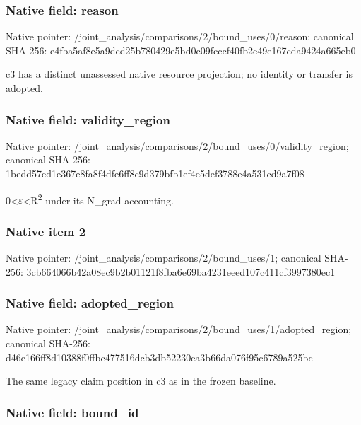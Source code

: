 \documentclass[10pt,a4paper]{article}
\begin{document}
\subsubsection{Native field: reason}


Native pointer: /joint\_analysis/comparis\allowbreak{}ons/2/bound\_uses/0/reaso\allowbreak{}n; canonical SHA-256: e4fba5af8e5a9dcd25b78042\allowbreak{}9e5bd0c09fcccf40fb2e49e1\allowbreak{}67cda9424a665eb0


c3 has a distinct unassessed native resource projection; no identity or transfer is adopted.


\subsubsection{Native field: validity\_region}


Native pointer: /joint\_analysis/comparis\allowbreak{}ons/2/bound\_uses/0/valid\allowbreak{}ity\_region; canonical SHA-256: 1bedd57ed1e367e8fa8f4dfe\allowbreak{}6ff8c9d379bfb1ef4e5def37\allowbreak{}88e4a531cd9a7f08


0<\ensuremath{\varepsilon}<R\textsuperscript{2} under its N\_grad accounting.


\subsubsection{Native item 2}


Native pointer: /joint\_analysis/comparis\allowbreak{}ons/2/bound\_uses/1; canonical SHA-256: 3cb664066b42a08ec9b2b011\allowbreak{}21f8fba6e69ba4231eeed107\allowbreak{}c411cf3997380ec1



\subsubsection{Native field: adopted\_region}


Native pointer: /joint\_analysis/comparis\allowbreak{}ons/2/bound\_uses/1/adopt\allowbreak{}ed\_region; canonical SHA-256: d46e166ff8d10388f0ffbc47\allowbreak{}7516dcb3db52230ea3b66da0\allowbreak{}76f95c6789a525bc


The same legacy claim position in c3 as in the frozen baseline.


\subsubsection{Native field: bound\_id}
\end{document}
